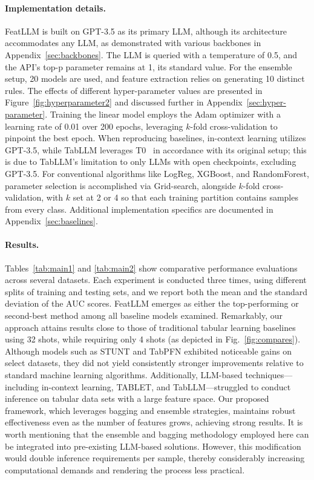 \paragraph{Implementation details.}
\textsf{FeatLLM} is built on GPT-3.5 as its primary LLM, although its architecture accommodates any LLM, as demonstrated with various backbones in Appendix~\ref{sec:backbones}. The LLM is queried with a temperature of 0.5, and the API’s top-p parameter remains at 1, its standard value. For the ensemble setup, 20 models are used, and feature extraction relies on generating 10 distinct rules. The effects of different hyper-parameter values are presented in Figure~\ref{fig:hyperparameter2} and discussed further in Appendix~\ref{sec:hyper-parameter}. Training the linear model employs the Adam optimizer with a learning rate of 0.01 over 200 epochs, leveraging $k$-fold cross-validation to pinpoint the best epoch. When reproducing baselines, in-context learning utilizes GPT-3.5, while TabLLM leverages T0~\cite{sanh2022multitask} in accordance with its original setup; this is due to TabLLM's limitation to only LLMs with open checkpoints, excluding GPT-3.5. For conventional algorithms like LogReg, XGBoost, and RandomForest, parameter selection is accomplished via Grid-search, alongside $k$-fold cross-validation, with $k$ set at 2 or 4 so that each training partition contains samples from every class. Additional implementation specifics are documented in Appendix~\ref{sec:baselines}.

\vspace*{-0.12in}
\paragraph{Results.}
Tables~\ref{tab:main1} and \ref{tab:main2} show comparative performance evaluations across several datasets. Each experiment is conducted three times, using different splits of training and testing sets, and we report both the mean and the standard deviation of the AUC scores. \textsf{FeatLLM} emerges as either the top-performing or second-best method among all baseline models examined. Remarkably, our approach attains results close to those of traditional tabular learning baselines using 32 shots, while requiring only 4 shots (as depicted in Fig.~\ref{fig:compares}). Although models such as STUNT and TabPFN exhibited noticeable gains on select datasets, they did not yield consistently stronger improvements relative to standard machine learning algorithms. Additionally, LLM-based techniques—including in-context learning, TABLET, and TabLLM—struggled to conduct inference on tabular data sets with a large feature space. Our proposed framework, which leverages bagging and ensemble strategies, maintains robust effectiveness even as the number of features grows, achieving strong results. It is worth mentioning that the ensemble and bagging methodology employed here can be integrated into pre-existing LLM-based solutions. However, this modification would double inference requirements per sample, thereby considerably increasing computational demands and rendering the process less practical.

